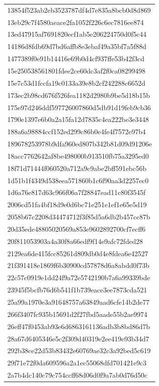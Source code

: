 \begin{tabular}{l}
13854f523ab2eb3523787df4d7e835a8bcb0d8d869 \\
13eb29c7f4580aeace2fa1052f226c6ec7816ee874 \\
13ed47915af7691820ecf1ab5e206224750d0f5c44 \\
14186d8fdb69d7bd6affb8e3ebaf49a35bf7a5f88d \\
1477389f0e91b14416e69b0d4cf937ffe53b42f3cd \\
15e250538561801fdee2ce60dc3af2f0ca08299498 \\
15e7c53d1fccfa19c0133a39e8b2cf242288c6652d \\
173ec2b98cd676f526fea1182d2980b9be5d18b15b \\
175e97d246ddf597726007860d5db91d19feb9cb36 \\
1790e1397e6b0a2a15fa12d7835c4ea222be3e3448 \\
188a6a98884ccf152ed299c86b0e4fe4f7572e97b4 \\
189678253978b9dfa960ed807b342b81d09d91206e \\
18acc7762642af8be498000b913510fb75a3295ed0 \\
18f71d71444f060520a712a9c9abe2bff591ebc56b \\
1d51b1f4349d538eea571860b1c6f90aa3d2257ec0 \\
1d6a76e817d63c966f06a7f28847ead11c80f3545f \\
2006cd51fa4bf18d9e0d6bc71e251e1ef1e65e5d19 \\
2058b67c2208d34474712f3f85d5a6db2b457cc87b \\
20d35ede48805020569a853e9602892700cf7ecff6 \\
20f811053903a4a30f8a66edf9f14e9afc72fded28 \\
2129ea6de415fcc85261d809db0d4e8fdea6e42527 \\
21f391418e1869f6b30900cd57878d6a8abdd0f73b \\
22c57c0919e1dd24f9a72e5742190b7a6a99339bde \\
23945f5bcfb76d6b541f1b739eace3ee7873cda521 \\
25a99a1970e3a91648757a63849aad6cfe14b2de77 \\
266f3407fc935b15691d2f27fbd5aade55b2ae9974 \\
26eff47f0453ab93e6d6863161136adb3b8bd86d7b \\
28a67d6405346e5c2f309d40319e2ee419e93b34d7 \\
292b38ce22d53b83432e60769ae32c3a92bed5c619 \\
29f71e72f0da609596a2a1ec55068dfd701421e9c3 \\
2a7b4dc140c79c754ccff68d06d0f9a7ab0d76d50c \\

\end{tabular}
